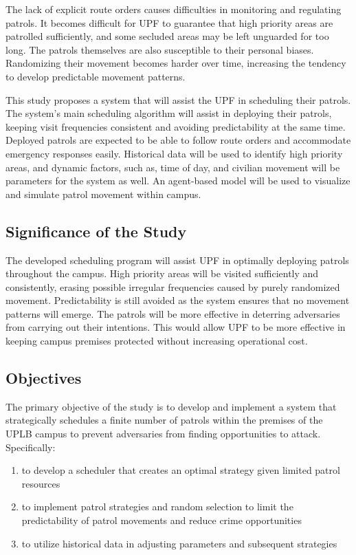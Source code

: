 \documentclass[journal]{./IEEE/IEEEtran}
\begin{document}
The lack of explicit route orders causes difficulties in monitoring and regulating patrols. It becomes difficult for UPF to guarantee that high priority areas are patrolled sufficiently, and some secluded areas may be left unguarded for too long. The patrols themselves are also susceptible to their personal biases. Randomizing their movement becomes harder over time, increasing the tendency to develop predictable movement patterns.

This study proposes a system that will assist the UPF in scheduling their patrols. The  system's main scheduling algorithm will assist in deploying their patrols, keeping visit frequencies consistent and avoiding predictability at the same time. Deployed patrols are expected to be able to follow route orders and accommodate emergency responses easily. Historical data will be used to identify high priority areas, and dynamic factors, such as, time of day, and civilian movement will be parameters for the system as well. An agent-based model will be used to visualize and simulate patrol movement within campus.

\subsection{Significance of the Study}

The developed scheduling program will assist UPF in optimally deploying patrols throughout the campus. High priority areas will be visited sufficiently and consistently, erasing possible irregular frequencies caused by purely randomized movement. Predictability is still avoided as the system ensures that no movement patterns will emerge. The patrols will be more effective in deterring adversaries from carrying out their intentions. This would allow UPF to be more effective in keeping campus premises protected without increasing operational cost.

\subsection{Objectives}
The primary objective of the study is to develop and implement a system that strategically schedules a finite number of patrols within the premises of the UPLB campus to prevent adversaries from finding opportunities to attack. Specifically:
\begin{enumerate}
\item{to develop a scheduler that creates an optimal strategy given limited patrol resources}
\item{to implement patrol strategies and random selection to limit the predictability of patrol movements and reduce crime opportunities}
\item{to utilize historical data in adjusting parameters and subsequent strategies}
\end{enumerate}
\end{document}
